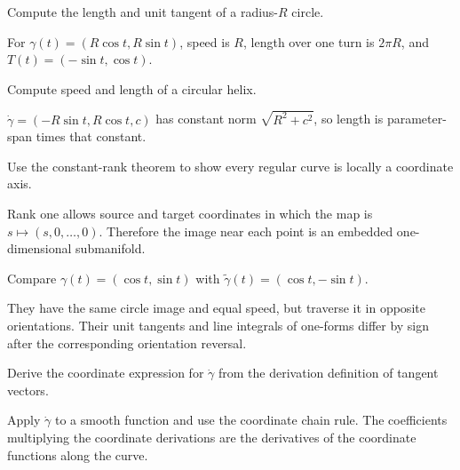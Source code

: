 \begin{problem}[Circle]\label{prob:vii12-06}
Compute the length and unit tangent of a radius-$R$ circle.
\end{problem}
\begin{solution}
For $\gamma(t)=(R\cos t,R\sin t)$, speed is $R$, length over one turn is $2\pi R$, and $T(t)=(-\sin t,\cos t)$.
\end{solution}

\begin{problem}[Helix]\label{prob:vii12-07}
Compute speed and length of a circular helix.
\end{problem}
\begin{solution}
$\dot\gamma=(-R\sin t,R\cos t,c)$ has constant norm $\sqrt{R^2+c^2}$, so length is parameter-span times that constant.
\end{solution}

\begin{problem}\label{prob:vii12-08}
Use the constant-rank theorem to show every regular curve is locally a coordinate axis.
\end{problem}
\begin{solution}
Rank one allows source and target coordinates in which the map is $s\mapsto(s,0,\ldots,0)$. Therefore the image near each point is an embedded one-dimensional submanifold.
\end{solution}

\begin{problem}\label{prob:vii12-09}
Compare $\gamma(t)=(\cos t,\sin t)$ with $\widetilde\gamma(t)=(\cos t,-\sin t)$.
\end{problem}
\begin{solution}
They have the same circle image and equal speed, but traverse it in opposite orientations. Their unit tangents and line integrals of one-forms differ by sign after the corresponding orientation reversal.
\end{solution}

\begin{problem}\label{prob:vii12-10}
Derive the coordinate expression for $\dot\gamma$ from the derivation definition of tangent vectors.
\end{problem}
\begin{solution}
Apply $\dot\gamma$ to a smooth function and use the coordinate chain rule. The coefficients multiplying the coordinate derivations are the derivatives of the coordinate functions along the curve.
\end{solution}

